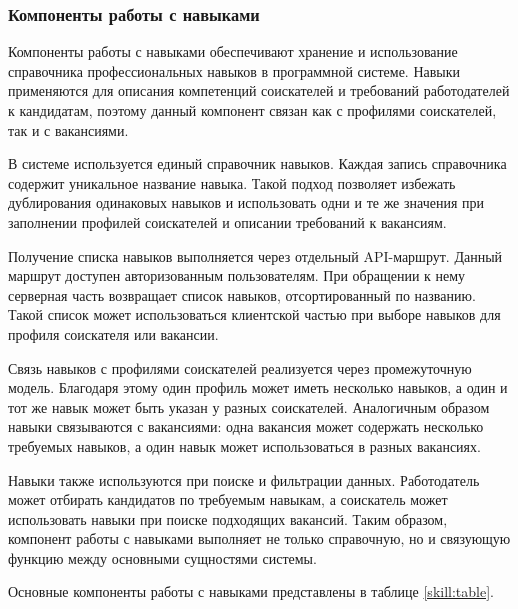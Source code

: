 \subsubsection{Компоненты работы с навыками}

Компоненты работы с навыками обеспечивают хранение и использование справочника профессиональных навыков в программной системе. Навыки применяются для описания компетенций соискателей и требований работодателей к кандидатам, поэтому данный компонент связан как с профилями соискателей, так и с вакансиями.

В системе используется единый справочник навыков. Каждая запись справочника содержит уникальное название навыка. Такой подход позволяет избежать дублирования одинаковых навыков и использовать одни и те же значения при заполнении профилей соискателей и описании требований к вакансиям.

Получение списка навыков выполняется через отдельный API-маршрут. Данный маршрут доступен авторизованным пользователям. При обращении к нему серверная часть возвращает список навыков, отсортированный по названию. Такой список может использоваться клиентской частью при выборе навыков для профиля соискателя или вакансии.

Связь навыков с профилями соискателей реализуется через промежуточную модель. Благодаря этому один профиль может иметь несколько навыков, а один и тот же навык может быть указан у разных соискателей. Аналогичным образом навыки связываются с вакансиями: одна вакансия может содержать несколько требуемых навыков, а один навык может использоваться в разных вакансиях.

Навыки также используются при поиске и фильтрации данных. Работодатель может отбирать кандидатов по требуемым навыкам, а соискатель может использовать навыки при поиске подходящих вакансий. Таким образом, компонент работы с навыками выполняет не только справочную, но и связующую функцию между основными сущностями системы.

Основные компоненты работы с навыками представлены в таблице \ref{skill:table}.

